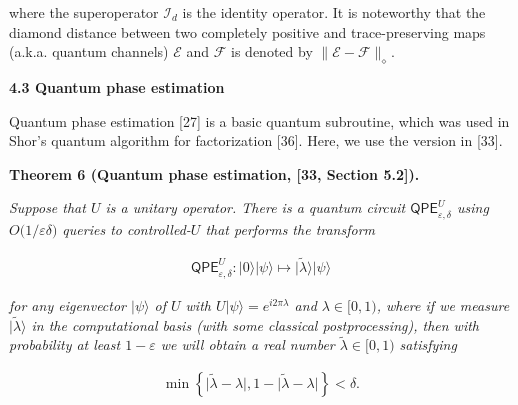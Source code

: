 where the superoperator $\mathcal{I}_{d}$ is the identity operator.
It is noteworthy that the diamond distance between two completely positive and trace-preserving maps (a.k.a. quantum channels) $\mathcal{E}$ and $\mathcal{F}$ is denoted by $\lVert\mathcal{E}-\mathcal{F}\rVert_{\diamond}$.\par





\par\medskip\noindent\textbf{
4.3 Quantum phase estimation}\par




Quantum phase estimation [27] is a basic quantum subroutine, which was used in Shor’s quantum algorithm for factorization [36].
Here, we use the version in [33].\par





\par\medskip\noindent\textbf{
\textbf{Theorem 6}\textbf{ }(Quantum phase estimation, [33, Section 5.2])\textbf{.}
}\par



\emph{Suppose that $U$ is a unitary operator.
There is a quantum circuit $\mathsf{QPE}^{U}_{\varepsilon,\delta}$ using $O\lparen 1/\varepsilon\delta\rparen$ queries to controlled-$U$ that performs the transform}\par


\[\begin{gathered}
\mathsf{QPE}^{U}_{\varepsilon,\delta}\colon\lvert 0\rangle\lvert\psi\rangle\mapsto\lvert\tilde{\lambda}\rangle\lvert\psi\rangle
\end{gathered}\]


\emph{for any eigenvector $\lvert\psi\rangle$ of $U$ with $U\lvert\psi\rangle=e^{i2\pi\lambda}$ and $\lambda\in[0,1)$,
where if we measure $\lvert\tilde{\lambda}\rangle$ in the computational basis (with some classical postprocessing), then with probability at least $1-\varepsilon$ we will obtain a real number $\tilde{\lambda}\in[0,1)$ satisfying}\par


\[\begin{gathered}
\min\left\{\lvert\tilde{\lambda}-\lambda\rvert,1-\lvert\tilde{\lambda}-\lambda\rvert\right\}<\delta.
\end{gathered}\]




